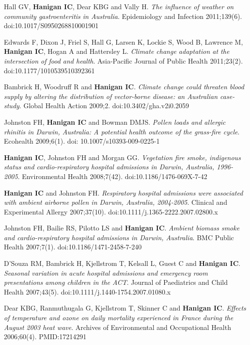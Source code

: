\documentclass[a4paper,11pt]{article}
\begin{document}
\begin{revnumerate}
\item Hall GV, \textbf{Hanigan IC}, Dear KBG and Vally H. \emph{The influence of weather on community gastroenteritis in Australia}. Epidemiology and Infection 2011;139(6). doi:10.1017/S0950268810001901

\item Edwards F, Dixon J, Friel S, Hall G, Larsen K, Lockie S, Wood B, Lawrence M, \textbf{Hanigan IC}, Hogan A and Hattersley L. \emph{Climate change adaptation at the intersection of food and health}. Asia-Pacific Journal of Public Health 2011;23(2). doi:10.1177/1010539510392361 

\item Bambrick H, Woodruff R and \textbf{Hanigan IC}. \emph{Climate change could threaten blood supply by altering the distribution of vector-borne disease: an Australian case-study}.  Global Health Action 2009;2. doi:10.3402/gha.v2i0.2059

\item Johnston FH, \textbf{Hanigan IC} and Bowman DMJS. \emph{Pollen loads and allergic rhinitis in Darwin, Australia: A potential health outcome of the grass-fire cycle}. Ecohealth 2009;6(1). doi: 10.1007/s10393-009-0225-1

\item \textbf{Hanigan IC}, Johnston FH and Morgan GG. \emph{Vegetation fire smoke, indigenous status and cardio-respiratory hospital admissions in Darwin, Australia, 1996-2005}. Environmental Health 2008;7(42). doi:10.1186/1476-069X-7-42

\item \textbf{Hanigan IC} and Johnston FH. \emph{Respiratory hospital admissions were associated with ambient airborne pollen in Darwin, Australia, 2004-2005}. Clinical and Experimental Allergy 2007;37(10). doi:10.1111/j.1365-2222.2007.02800.x

\item Johnston FH, Bailie RS, Pilotto LS and \textbf{Hanigan IC}. \emph{Ambient biomass smoke and cardio-respiratory hospital admissions in Darwin, Australia}. BMC Public Health 2007;7(1). doi:10.1186/1471-2458-7-240

\item D’Souza RM, Bambrick H, Kjellstrom T, Kelsall L, Guest C and \textbf{Hanigan IC}. \emph{Seasonal variation in acute hospital admissions and emergency room presentations among children in the ACT}. Journal of Paediatrics and Child Health 2007;43(5). doi:10.1111/j.1440-1754.2007.01080.x

\item Dear KBG, Ranmuthugala G, Kjellstrom T, Skinner C and \textbf{Hanigan IC}. \emph{Effects of temperature and ozone on daily mortality experienced in France during the August 2003 heat wave}. Archives of Environmental and Occupational Health 2006;60(4). PMID:17214291


\end{revnumerate}
\end{document}
